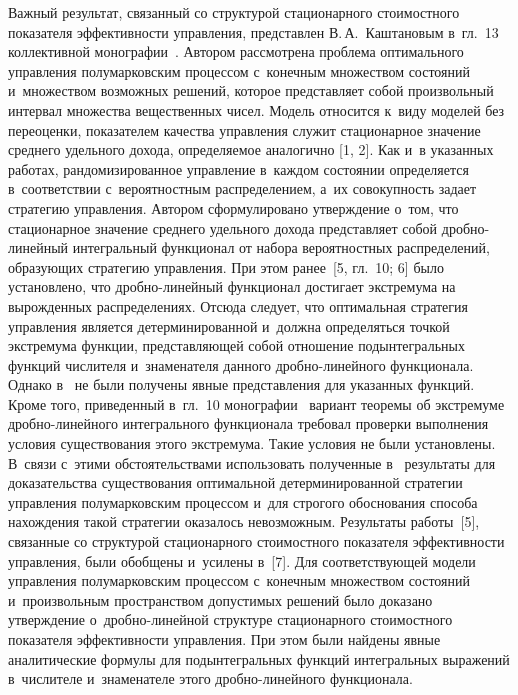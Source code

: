\begin{multicols}{2}
Важный результат, связанный со структурой стационарного стоимостного показателя 
эффективности управления, представлен В.\,А.~Каштановым в~гл.~13 коллективной 
монографии~\cite{5}. Автором рассмотрена проблема оптимального управления 
полумарковским процессом с~конечным множеством состояний и~множеством возможных 
решений, которое представляет собой произвольный интервал множества вещественных 
чисел. Модель относится к~виду моделей без переоценки, показателем качества 
управления служит стационарное значение среднего удельного дохода, опре\-де\-ля\-емое 
аналогично [1, 2]. Как и~в указанных работах, рандомизированное управление в~каж\-дом 
со\-сто\-янии определяется в~соответствии с~вероятностным распределением, 
а~их совокупность задает стратегию управ\-ле\-ния. Автором сформулировано утверж\-де\-ние 
о~том, что стационарное значение среднего удельного дохода пред\-став\-ля\-ет собой 
дроб\-но-ли\-ней\-ный интегральный функционал от набора вероятностных распределений, 
образующих стратегию управления. При этом ранее~[5, гл.~10; 6] было установлено, 
что дроб\-но-ли\-ней\-ный функционал достигает экстремума на вы\-рож\-ден\-ных 
распределениях. Отсюда следует, что оптимальная стратегия управ\-ле\-ния является 
детерминированной и~должна определяться точкой экстремума функции, 
представляющей собой отношение подынтегральных функций числителя и~знаменателя 
данного дроб\-но-ли\-ней\-но\-го функционала. Однако в~\cite{5} не были получены явные 
представления для указанных функций. Кроме того, приведенный в~гл.~10 
монографии~\cite{5} вариант теоремы об экстремуме дроб\-но-ли\-ней\-но\-го интегрального 
функционала требовал проверки выполнения условия существования этого экстремума. 
Такие условия не были уста\-нов\-ле\-ны. В~связи с~этими обстоятельствами использовать 
полученные в~\cite{5} результаты для доказательства существования оптимальной 
детерминированной стратегии управ\-ле\-ния полумарковским процессом и~для строгого 
обоснования способа нахождения такой стратегии оказалось невозможным. Результаты 
работы~[5], связанные со структурой стационарного стоимостного показателя 
эффективности управления, были обобщены и~усилены в~[7]. Для со\-от\-вет\-ст\-ву\-ющей 
модели управ\-ле\-ния полумарковским процессом с~конечным множеством со\-сто\-яний 
и~произвольным пространством допустимых решений было доказано утверждение 
о~дроб\-но-ли\-ней\-ной структуре стационарного стоимостного показателя эффективности 
управления. При этом были найдены явные аналитические формулы для 
подын\-тег\-раль\-ных функций интегральных выражений в~числителе и~знаменателе этого 
дроб\-но-ли\-ней\-но\-го функционала.


\end{multicols}
